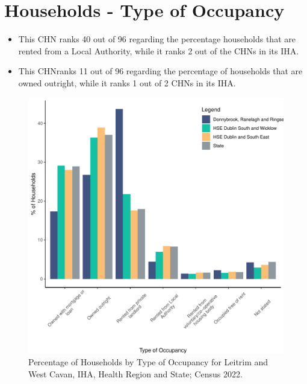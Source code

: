 \documentclass{article}
\begin{document}
\section{Households - Type of Occupancy}\label{sect:Households}
\begin{itemize}
\item This CHN ranks  40 out of 96 regarding the percentage households that are rented from a Local Authority, while it ranks  2 out of the CHNs in its IHA. 
\item This CHNranks  11 out of 96 regarding the percentage of households that are owned outright, while it ranks   1 out of 2 CHNs in its IHA.
\end{itemize}
\begin{figure}[H]
	\centering
	\includegraphics[width = 140mm]{../figures/HouseholdsED.pdf}
	\caption{Percentage of Households by Type of Occupancy for Leitrim and West Cavan, IHA, Health Region and State; Census 2022.}
	\label{fig:vbnv}
	\end{figure}
\end{document}
